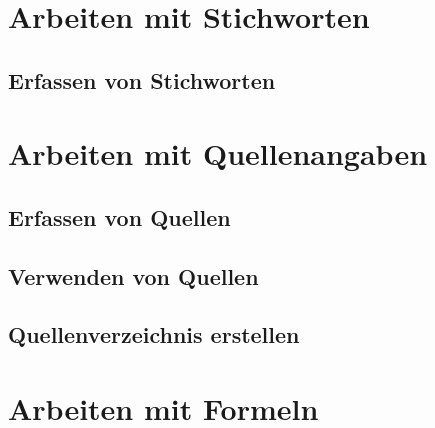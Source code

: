 \documentclass[12pt, a4paper, sectionentrydots=true, listof=totoc, listof=entryprefix, numbers=endperiod]{scrartcl}
\begin{document}
\section{Arbeiten mit Stichworten} 
\label{Stichworte}
\begin{spacing}{1.25}

\end{spacing}
%
%
\subsection{Erfassen von Stichworten}
\begin{spacing}{1.25}

\end{spacing}
%
%
%
%
%
%
\pagebreak 
\section{Arbeiten mit Quellenangaben}
\begin{spacing}{1.25}

\end{spacing}
%
%
\subsection{Erfassen von Quellen}
\begin{spacing}{1.25}

\end{spacing}
%
%
\subsection{Verwenden von Quellen}
\begin{spacing}{1.25}

\end{spacing}
%
%
\subsection{Quellenverzeichnis erstellen}
\begin{spacing}{1.25}

\end{spacing}
%
%
%
%
%
%
\pagebreak 
\section{Arbeiten mit Formeln}
\begin{spacing}{1.25}

\end{spacing}
%
%
\pagebreak 
\end{document}
